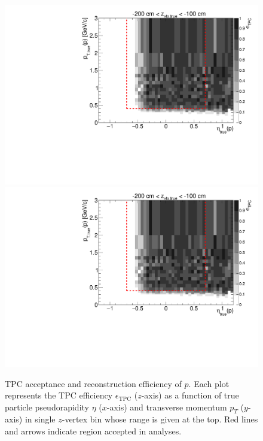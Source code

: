 \begin{figure}[hb]
\caption[TPC acceptance and reconstruction efficiency of $p$.]{TPC acceptance and reconstruction efficiency of $p$. Each plot represents the TPC efficiency $\epsilon_{\text{TPC}}$ ($z$-axis) as a function of true particle pseudorapidity $\eta$ ($x$-axis) and transverse momentum $p_{T}$ ($y$-axis) in single $z$-vertex bin whose range is given at the top. Red lines and arrows indicate region accepted in analyses.}\label{fig:tpcEff_proton_plus}
\centering
\parbox{0.495\textwidth}{
  \centering
  \includegraphics[width=\linewidth,page=3]{graphics/eff/Eff2D_TPC_proton_Plus.pdf}\\
  \includegraphics[width=\linewidth,page=5]{graphics/eff/Eff2D_TPC_proton_Plus.pdf}\\
}
\end{figure}
